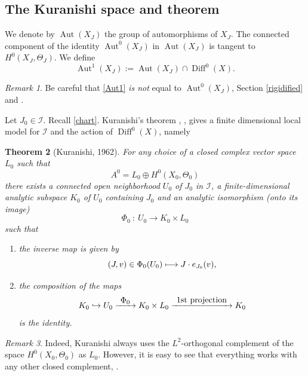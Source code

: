 \documentclass[10pt]{amsart}
\let\mathcal\mathscr
\def\mto{\mathchoice{\longmapsto}{\mapsto}{\mapsto}{\mapsto}}
\def\hto{\mathrel{\lhook\joinrel\to}}
\def\To#1{\mathchoice{\xrightarrow{\textstyle\kern4pt#1\kern3pt}}{\stackrel{#1}{\longrightarrow}}{}{}}
\DeclareMathOperator{\Aut}{Aut}
\DeclareMathOperator{\Diff}{Diff}
\theoremstyle{plain}
\newtheorem{theorem}{Theorem}[section]
\theoremstyle{definition}
\theoremstyle{remark}
\newtheorem{remark}[theorem]{Remark}
\numberwithin{equation}{section}
\newcommand{\cI}{\mathcal{I}}
\begin{document}
\subsection{The Kuranishi space and theorem}
\label{Kuranishi}

We denote by $\Aut(X_J)$ the group of automorphisms of $X_J$. The connected component of the identity $\Aut^0(X_J)$ in $\Aut(X_J)$ is tangent to $H^0(X_J,\Theta_J)$. We define
\begin{equation}
\label{Aut1}
\Aut^1(X_J):=\Aut(X_J)\cap\Diff^0(X).
\end{equation}
\begin{remark}
\label{Autattention}
Be careful that \eqref{Aut1} \emph{is not} equal to $\Aut^0(X_J)$, \cf Section \ref{rigidified} and \cite{Aut1paper}.
\end{remark}

Let $J_0\in \cI$. Recall \eqref{chart}. Kuranishi's theorem \cite{Ku1}, \cite{Kur1}, \cite{Ku3} gives a finite dimensional local model for $\cI$ and the action of $\Diff^0(X)$, namely

\begin{theorem}[Kuranishi, 1962]
\label{KuranishiTheorem}
For any choice of a closed complex vector space~$L_0$ such that
\begin{equation}
\label{A0}
A^0=L_0\oplus H^0(X_0,\Theta_{0})
\end{equation}
there exists a connected open neighborhood $U_0$ of $J_0$ in $\cI$, a finite-dimensional analytic subspace $K_0$ of $U_0$ containing $J_0$ and an analytic isomorphism (onto its image)
\begin{equation}
\label{Phi0}
\Phi_0\ :\ U_0\longrightarrow K_0\times L_0
\end{equation}
such that
\begin{enumerate}
\item
the inverse map is given by
\begin{equation}
\label{Kuranishiaction}
(J,v)\in \Phi_0(U_0)\mto J\cdot e_{J_0}(v),
\end{equation}
\item
the composition of the maps
\begin{equation}
\label{id}
K_0\hto U_0\To{\Phi_0} K_0\times L_0 \To{\textup{1st projection}}K_0
\end{equation}
is the identity.
\end{enumerate}
\end{theorem}

\begin{remark}
Indeed, Kuranishi always uses the $L^2$-orthogonal complement of the space $H^0(X_0,\Theta_{0})$ as $L_0$. However, it is easy to see that everything works with any other closed complement, \cf \cite{circle}.
\end{remark}
\end{document}
